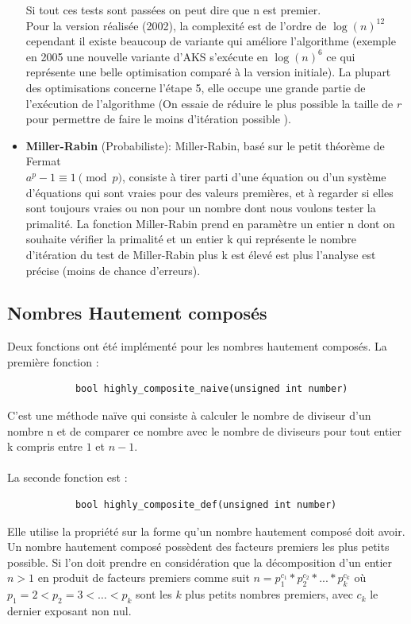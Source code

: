 \begin{itemize}
Si tout ces tests sont passées on peut dire que n est premier.\\
Pour la version réalisée (2002), la complexité est de l'ordre de $\log(n)^{12}$ cependant il existe beaucoup de variante qui améliore l'algorithme (exemple en 2005 une nouvelle variante d'AKS s’exécute en $\log(n)^6$ ce qui représente une belle optimisation comparé à la version initiale). La plupart des optimisations concerne l'étape 5, elle occupe une grande partie de l'exécution de l'algorithme (On essaie de réduire le plus possible la taille de $r$ pour permettre de faire le moins d'itération possible ).\\
			
			\item \textbf{Miller-Rabin} (Probabiliste): Miller-Rabin, basé sur le petit théorème de Fermat \\ $a^p-1 \equiv 1 \pmod p$, consiste à tirer parti d'une équation ou d'un système d'équations qui sont vraies pour des valeurs premières, et à regarder si elles sont toujours vraies ou non pour un nombre dont nous voulons tester la primalité. La fonction Miller-Rabin prend en paramètre un entier n dont on souhaite vérifier la primalité et un entier k qui représente le nombre d’itération du test de Miller-Rabin plus k est élevé est plus l’analyse est précise (moins de chance d’erreurs).\\
		\end{itemize}
		
		\subsection{Nombres Hautement composés}
		Deux fonctions ont été implémenté pour les nombres hautement composés. La première fonction : 				\begin{lstlisting}
			bool highly_composite_naive(unsigned int number)
		\end{lstlisting}
		C'est une méthode naïve qui consiste à calculer le nombre de diviseur d'un nombre n et de comparer ce nombre avec le nombre de diviseurs pour tout entier k compris entre $1$ et $n-1$.
		\paragraph{}La seconde fonction est :
		\begin{lstlisting}
			bool highly_composite_def(unsigned int number)
		\end{lstlisting}
		Elle utilise la propriété sur la forme qu'un nombre hautement composé doit avoir. Un nombre hautement composé possèdent des facteurs premiers les plus petits possible. Si l'on doit prendre en considération que la décomposition d'un entier $n > 1$ en produit de facteurs premiers comme suit  $n = p_1^{c_1} * p_2^{c_2} * ... * p_k^{c_k}$ où $p_1 = 2 < p_2 = 3 < … < p_k$ sont les $k$ plus petits nombres premiers, avec $c_k$ le dernier exposant non nul.
